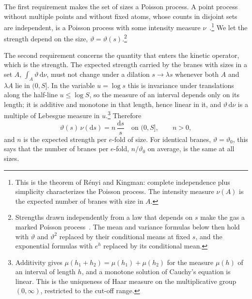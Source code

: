 \documentclass[a4paper,11pt]{article}
\newcommand{\dd}{\mathrm{d}}
\begin{document}
The first requirement makes the set of sizes a Poisson process. A point process without multiple points and without fixed atoms, whose counts in disjoint sets are independent, is a Poisson process with some intensity measure $\nu$~\cite{Kingman1993,LastPenrose2017}.\footnote{This is the theorem of R\'enyi and Kingman: complete independence plus simplicity characterizes the Poisson process. The intensity measure $\nu(A)$ is the expected number of branes with size in $A$.} We let the strength depend on the size, $\vartheta=\vartheta(s)$.\footnote{Strengths drawn independently from a law that depends on $s$ make the gas a marked Poisson process~\cite{Kingman1993}. The mean and variance formulas below then hold with $\vartheta$ and $\vartheta^2$ replaced by their conditional means at fixed $s$, and the exponential formulas with $e^{h}$ replaced by its conditional mean.}

The second requirement concerns the quantity that enters the kinetic operator, which is the strength. The expected strength carried by the branes with sizes in a set $A$, $\int_A\vartheta\,\dd\nu$, must not change under a dilation $s\to\lambda s$ whenever both $A$ and $\lambda A$ lie in $(0,S]$. In the variable $u=\log s$ this is invariance under translations along the half-line $u\le\log S$, so the measure of an interval depends only on its length; it is additive and monotone in that length, hence linear in it, and $\vartheta\,\dd\nu$ is a multiple of Lebesgue measure in $u$.\footnote{Additivity gives $\mu(h_1+h_2)=\mu(h_1)+\mu(h_2)$ for the measure $\mu(h)$ of an interval of length $h$, and a monotone solution of Cauchy's equation is linear. This is the uniqueness of Haar measure on the multiplicative group $(0,\infty)$, restricted to the cut-off range.} Therefore
\begin{equation}
\label{eq:intensity}
\vartheta(s)\,\nu(\dd s)=n\,\frac{\dd s}{s}\quad\text{on }(0,S],\qquad n>0 ,
\end{equation}
and $n$ is the expected strength per $e$-fold of size. For identical branes, $\vartheta=\vartheta_0$, this says that the number of branes per $e$-fold, $n/\vartheta_0$ on average, is the same at all sizes.
\end{document}
